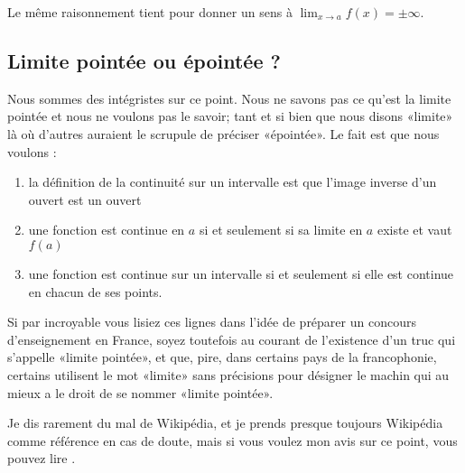 Le même raisonnement tient pour donner un sens à \( \lim_{x\to a} f(x)=\pm \infty\).

\subsection{Limite pointée ou épointée ?}
\label{SUBSECooVHKCooYRFgrb}

Nous sommes des intégristes sur ce point. Nous ne savons pas ce qu'est la limite pointée et nous ne voulons pas le savoir; tant et si bien que nous disons «limite» là où d'autres auraient le scrupule de préciser «épointée». Le fait est que nous voulons :
\begin{enumerate}
    \item
        la définition de la continuité sur un intervalle est que l'image inverse d'un ouvert est un ouvert
    \item
        une fonction est continue en \( a\) si et seulement si sa limite en \( a\) existe et vaut \( f(a)\)
    \item
        une fonction est continue sur un intervalle si et seulement si elle est continue en chacun de ses points.
\end{enumerate}
Si par incroyable vous lisiez ces lignes dans l'idée de préparer un concours d'enseignement en France, soyez toutefois au courant de l'existence d'un truc qui s'appelle «limite pointée», et que, pire, dans certains pays de la francophonie, certains utilisent le mot «limite» sans précisions pour désigner le machin qui au mieux a le droit de se nommer «limite pointée».

Je dis rarement du mal de Wikipédia, et je prends presque toujours Wikipédia comme référence en cas de doute, mais si vous voulez mon avis sur ce point, vous pouvez lire \cite{ooEJTBooFehGbZ}.

